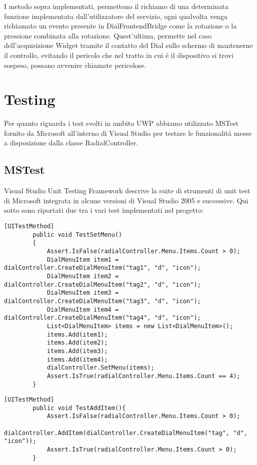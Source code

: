 I metodo sopra implementati, permettono il richiamo di una determinata funzione implementata dall'utilizzatore del servizio, ogni qualvolta venga richiamato un evento presente in DialFrontendBridge come la rotazione o la pressione combinata alla rotazione.
Quest'ultima, permette nel caso dell'acquisizione Widget tramite il contatto del Dial sullo schermo di mantenerne il controllo, evitando il pericolo che nel tratto in cui é il dispositivo si trovi sospeso, possano avvenire chiamate pericolose.

\section{Testing}

Per quanto riguarda i test svolti in ambito UWP abbiamo utilizzato MSTest fornito da Microsoft all’interno di Visual Studio per testare le funzionalitá messe a disposizione dalla classe RadialController.

\subsection{MSTest}
Visual Studio Unit Testing Framework descrive la suite di strumenti di unit test di Microsoft integrata in alcune versioni di Visual Studio 2005 e successive.
Qui sotto sono riportati due tra i vari test implementati nel progetto:
 
\vspace{1.0cm}
\begin{lstlisting}[caption={Test SetMenu},style=javaScriptCode]
    [UITestMethod]
        public void TestSetMenu()
        {
            Assert.IsFalse(radialController.Menu.Items.Count > 0);
            DialMenuItem item1 = dialController.CreateDialMenuItem("tag1", "d", "icon");
            DialMenuItem item2 = dialController.CreateDialMenuItem("tag2", "d", "icon");
            DialMenuItem item3 = dialController.CreateDialMenuItem("tag3", "d", "icon");
            DialMenuItem item4 = dialController.CreateDialMenuItem("tag4", "d", "icon");
            List<DialMenuItem> items = new List<DialMenuItem>();
            items.Add(item1);
            items.Add(item2);
            items.Add(item3);
            items.Add(item4);
            dialController.SetMenu(items);
            Assert.IsTrue(radialController.Menu.Items.Count == 4);
        }
\end{lstlisting} 
\vspace{1.0cm}

\vspace{1.0cm}
\begin{lstlisting}[caption={Test aggiunta voce di Menu'},style=javaScriptCode]
  [UITestMethod]
        public void TestAddItem(){
            Assert.IsFalse(radialController.Menu.Items.Count > 0);
            dialController.AddItem(dialController.CreateDialMenuItem("tag", "d", "icon"));
            Assert.IsTrue(radialController.Menu.Items.Count > 0);
        }
\end{lstlisting} 
\vspace{1.0cm}
